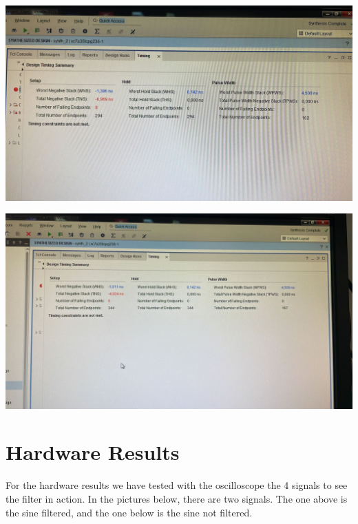 \documentclass[a4paper, 12pt]{article}
\begin{document}
\begin{center}
\includegraphics[width=.9\linewidth]{./img/time_report_pipeline_simple.jpg}
\end{center}

\begin{center}
\includegraphics[width=.9\linewidth]{./img/time_report_pipeline.jpg}
\end{center}
\section{Hardware Results}
\label{sec:org2555a58}
For the hardware results we have tested with the oscilloscope the 4 signals to see the filter in action. In the pictures below, there are two signals. The one above is the sine filtered, and the one below is the sine not filtered.
\end{document}
